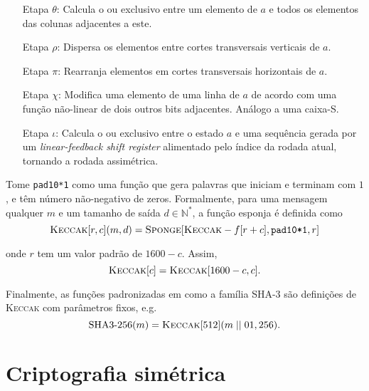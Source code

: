 \documentclass[12pt]{report}
\begin{document}
\begin{enumerate}

  \item[Etapa $\theta$:] Calcula o ou exclusivo entre um elemento de $a$ e
    todos os elementos das colunas adjacentes a este.

  \item[Etapa $\rho$:] Dispersa os elementos entre cortes transversais
    verticais de $a$.

  \item[Etapa $\pi$:] Rearranja elementos em cortes transversais horizontais de
    $a$.

  \item[Etapa $\chi$:] Modifica uma elemento de uma linha de $a$ de acordo com
    uma função não-linear de dois outros bits adjacentes. Análogo a uma caixa-S.

  \item[Etapa $\iota$:] Calcula o ou exclusivo entre o estado $a$ e uma
    sequência gerada por um \emph{linear-feedback shift register} alimentado
    pelo índice da rodada atual, tornando a rodada assimétrica.

\end{enumerate}

Tome \texttt{pad10*1} como uma função que gera palavras que iniciam e terminam
com $1$, e têm número não-negativo de zeros. Formalmente, para uma mensagem
qualquer $m$ e um tamanho de saída $d \in \mathbb{N}^{*}$, a função esponja é
definida como
\begin{equation}
  \textsc{Keccak}[r, c](m, d)
    = \textsc{Sponge}[\textsc{Keccak}-f[r + c], \texttt{pad10*1}, r]
\end{equation}

onde $r$ tem um valor padrão de $1600 - c$. Assim,
\begin{equation}
  \textsc{Keccak}[c] = \textsc{Keccak}[1600 - c, c].
\end{equation}

Finalmente, as funções padronizadas em \cite{Dworkin2015} como a família SHA-3
são definições de \textsc{Keccak} com parâmetros fixos, e.g.
\begin{equation}
  \text{SHA3-}256(m) = \textsc{Keccak}[512](m \; \vert \vert \; 01, 256).
\end{equation}

\section{Criptografia simétrica}
\end{document}
